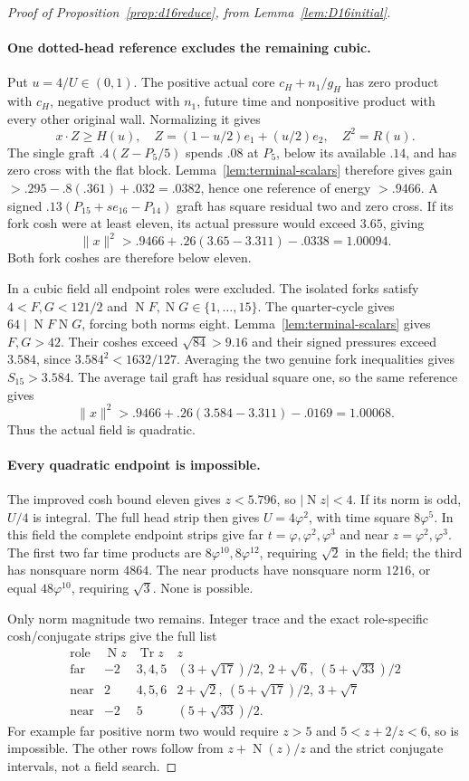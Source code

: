 \documentclass[11pt]{article}
\newcommand{\Tr}{\operatorname{Tr}}
\newcommand{\N}{\operatorname{N}}
\begin{document}
\begin{proof}[Proof of Proposition~\ref{prop:d16reduce}, from
Lemma~\ref{lem:D16initial}]
\paragraph{One dotted-head reference excludes the remaining cubic.}
Put $u=4/U\in(0,1)$. The positive actual core $c_H+n_1/g_H$
has zero product with $c_H$, negative product with $n_1$, future
time and nonpositive product with every other original wall.
Normalizing it gives
\[
 x\cdot Z\ge H(u),\quad
 Z=(1-u/2)e_1+(u/2)e_2,\quad Z^2=R(u).
\]
The single graft $.4(Z-P_5/5)$ spends $.08$ at $P_5$,
below its available $.14$, and has zero cross with the flat block.
Lemma~\ref{lem:terminal-scalars} therefore gives gain
$>.295-.8(.361)+.032=.0382$, hence one reference of energy
$>.9466$. A signed $.13(P_{15}+s e_{16}-P_{14})$ graft has
square residual two and zero cross. If its fork cosh were at least
eleven, its actual pressure would exceed $3.65$, giving
\[
 \|x\|^2>.9466+.26(3.65-3.311)-.0338=1.00094.
\]
Both fork coshes are therefore below eleven.

In a cubic field all endpoint roles were excluded. The isolated
forks satisfy $4<F,G<121/2$ and $\N F,\N G\in\{1,\ldots,15\}$.
The quarter-cycle gives $64\mid\N F\N G$, forcing both norms
eight. Lemma~\ref{lem:terminal-scalars} gives $F,G>42$.
Their coshes exceed $\sqrt{84}>9.16$ and their signed pressures
exceed $3.584$, since $3.584^2<1632/127$.
Averaging the two genuine fork inequalities gives $S_{15}>3.584$.
The average tail graft has residual square one, so the same reference
gives
\[
 \|x\|^2>.9466+.26(3.584-3.311)-.0169=1.00068.
\]
Thus the actual field is quadratic.

\paragraph{Every quadratic endpoint is impossible.}
The improved cosh bound eleven gives $z<5.796$, so
$|\N z|<4$. If its norm is odd, $U/4$ is integral.
The full head strip then gives $U=4\varphi^2$, with time square
$8\varphi^5$. In this field the complete endpoint strips give far
$t=\varphi,\varphi^2,\varphi^3$ and near
$z=\varphi^2,\varphi^3$. The first two far time products are
$8\varphi^{10},8\varphi^{12}$, requiring $\sqrt2$ in the field;
the third has nonsquare norm $4864$.
The near products have nonsquare norm $1216$, or equal
$48\varphi^{10}$, requiring $\sqrt3$. None is possible.

Only norm magnitude two remains. Integer trace and the exact
role-specific cosh/conjugate strips give the full list
\[
\begin{array}{c|r|c|l}
\text{role}&\N z&\Tr z&z\\\hline
\text{far}&-2&3,4,5&(3+\sqrt{17})/2,\ 2+\sqrt6,\ (5+\sqrt{33})/2\\
\text{near}&2&4,5,6&2+\sqrt2,\ (5+\sqrt{17})/2,\ 3+\sqrt7\\
\text{near}&-2&5&(5+\sqrt{33})/2.
\end{array}
\]
For example far positive norm two would require $z>5$ and
$5<z+2/z<6$, so is impossible. The other rows follow from
$z+\N(z)/z$ and the strict conjugate intervals, not a field search.


\end{proof}
\end{document}
